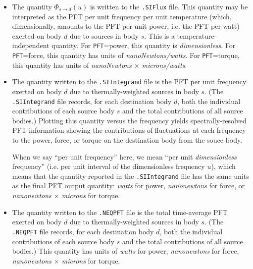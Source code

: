 \documentclass[letterpaper]{article}
\begin{document}
\begin{itemize}
  \item The quantity $\Phi_{s\to d}(u)$ is written to the
        \texttt{.SIFlux} file. This quantity may be interpreted
        as the PFT per unit frequency per unit temperature 
        (which, dimensionally, amounts to the PFT per unit 
         power, i.e. the PFT per watt) exerted on body $d$ 
        due to sources
        in body $s.$ This is a temperature-independent quantity.
        For \texttt{PFT}=power, this quantity
        is \textit{dimensionless}. For \texttt{PFT}=force,
        this quantity has units of \textit{nanoNewtons/watts}.
        For \texttt{PFT}=torque, this quantity has units of 
        \textit{nanoNewtons $\times$ microns/watts}.

  \item The quantity written to the \texttt{.SIIntegrand} file
        is the PFT per unit frequency exerted on body $d$ due
        to thermally-weighted sources in body $s$.
        (The \texttt{.SIIntegrand} file records, for each 
         destination body $d$, both the individual contributions
         of each source body $s$ and the total contributions
         of all source bodies.) Plotting this quantity
         versus the frequency yields spectrally-resolved
         PFT information showing the contributions of fluctuations
         at each frequency to the power, force, or torque on 
         the destination body from the souce body.

         When we say ``per unit frequency'' here, we mean 
         ``per unit \textit{dimensionless} frequency'' 
         (i.e. per unit interval of the dimensionless 
          frequency $u$), which means that the quantity 
         reported in the \texttt{.SIIntegrand} file has the 
         same units as the final PFT output quantity:
         \textit{watts} for power,
         \textit{nanonewtons} for force, or 
         \textit{nanonewtons $\times$ microns} for torque.

  \item The quantity written to the \texttt{.NEQPFT} file
        is the total time-average PFT exerted on body $d$ due to 
        thermally-weighted sources in body $s$.
        (The \texttt{.NEQPFT} file records, for each
         destination body $d$, both the individual contributions
         of each source body $s$ and the total contributions
         of all source bodies.)
         This quantity has units of 
         \textit{watts} for power,
         \textit{nanonewtons} for force,
         \textit{nanonewtons $\times$ microns} for torque.
\end{itemize}
\end{document}
